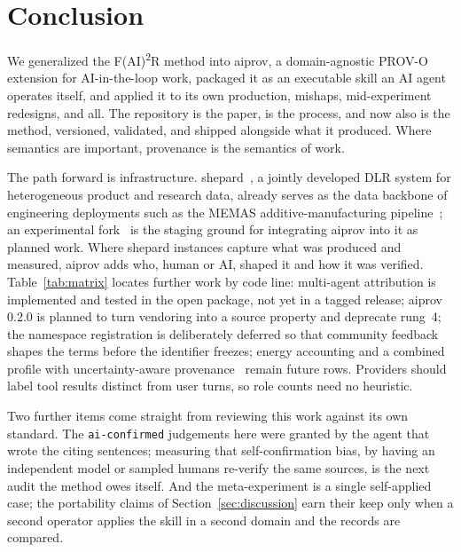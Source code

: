 \section{Conclusion}\label{sec:conclusion}

We generalized the F(AI)\textsuperscript{2}R method into aiprov, a
domain-agnostic PROV-O extension for AI-in-the-loop work, packaged it
as an executable skill an AI agent operates itself, and applied it to
its own production, mishaps, mid-experiment redesigns, and all. The
repository is the paper, is the process, and now also is the method,
versioned, validated, and shipped alongside what it produced. Where
semantics are important, provenance is the semantics of work.

The path forward is infrastructure. shepard~\cite{shepard}, a jointly
developed DLR system for heterogeneous product and research data,
already serves as the data backbone of engineering deployments such as
the MEMAS additive-manufacturing pipeline~\cite{memas2024}; an
experimental fork~\cite{shepard-fork} is the staging ground for
integrating aiprov into it as planned work. Where shepard instances
capture what was produced and measured, aiprov adds who, human or AI,
shaped it and how it was verified. Table~\ref{tab:matrix} locates
further work by code line: multi-agent attribution is implemented and
tested in the open package, not yet in a tagged release; aiprov 0.2.0
is planned to turn vendoring into a source property and deprecate
rung~4; the namespace registration is deliberately deferred so that
community feedback shapes the terms before the identifier freezes;
energy accounting and a combined profile with uncertainty-aware
provenance~\cite{uncertainty-prov2026} remain future rows. Providers
should label tool results distinct from user turns, so role counts
need no heuristic.

Two further items come straight from reviewing this work against its
own standard. The \texttt{ai-confirmed} judgements here were granted
by the agent that wrote the citing sentences; measuring that
self-confirmation bias, by having an independent model or sampled
humans re-verify the same sources, is the next audit the
method owes itself. And the meta-experiment is a single self-applied
case; the portability claims of Section~\ref{sec:discussion} earn
their keep only when a second operator applies the skill in a second
domain and the records are compared.

